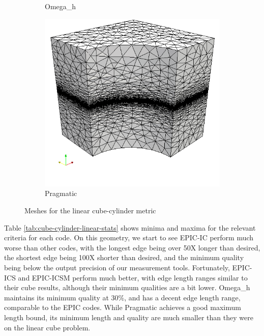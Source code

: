 \documentclass[3p,times,procedia,number]{elsarticle}
\begin{document}
\begin{figure}
\begin{subfigure}{.24\textwidth}
\caption{Omega\_h}
\end{subfigure}
\begin{subfigure}{.24\textwidth}
\centering
\includegraphics[width=\textwidth]{pragmatic-cube-cylinder-linear.png}
\caption{Pragmatic}
\end{subfigure}
\caption{Meshes for the linear cube-cylinder metric}
\label{fig:cube-cylinder-linear-meshes}
\end{figure}

Table \ref{tab:cube-cylinder-linear-stats} shows minima
and maxima for the relevant criteria for each code.
On this geometry, we start to see EPIC-IC perform much
worse than other codes, with the longest edge being over
50X longer than desired, the shortest edge being
100X shorter than desired, and the minimum quality being
below the output precision of our measurement tools.
Fortunately, EPIC-ICS and EPIC-ICSM perform much better,
with edge length ranges similar to their cube results,
although their minimum qualities are a bit lower.
Omega\_h maintains its minimum quality at 30\%, and
has a decent edge length range, comparable to the EPIC codes.
While Pragmatic achieves a good maximum length bound,
its minimum length and quality are much smaller than they
were on the linear cube problem.
\end{document}

